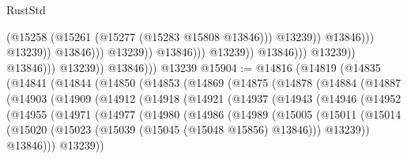 \begin{lexlean}{RustStd}
\begin{coremodule}
                                                              (@15258
                                                                (@15261
                                                                  (@15277 (@15283 @15808 @13846)))
                                                                @13239))
                                                            @13846)))
                                                      @13239))
                                                  @13846)))
                                            @13239))
                                        @13846)))
                                  @13239))
                              @13846)))
                        @13239))
                    @13846)))
              @13239))
          @13846)))
    @13239
@15904 := @14816
    (@14819
      (@14835
        (@14841
          (@14844
            (@14850
              (@14853
                (@14869
                  (@14875
                    (@14878
                      (@14884
                        (@14887
                          (@14903
                            (@14909
                              (@14912
                                (@14918
                                  (@14921
                                    (@14937
                                      (@14943
                                        (@14946
                                          (@14952
                                            (@14955
                                              (@14971
                                                (@14977
                                                  (@14980
                                                    (@14986
                                                      (@14989
                                                        (@15005
                                                          (@15011
                                                            (@15014
                                                              (@15020
                                                                (@15023
                                                                  (@15039
                                                                    (@15045
                                                                      (@15048 @15856)
                                                                      @13846)))
                                                                @13239))
                                                            @13846)))
                                                      @13239))

\end{coremodule}
\end{lexlean}
